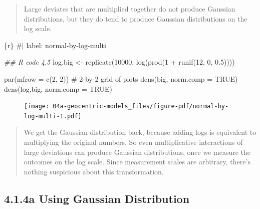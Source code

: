 \documentclass[
  letterpaper,
  DIV=11,
  numbers=noendperiod]{scrreprt}
\newenvironment{Shaded}{\begin{snugshade}}{\end{snugshade}}
\newcommand{\AttributeTok}[1]{\textcolor[rgb]{0.40,0.45,0.13}{#1}}
\newcommand{\CommentTok}[1]{\textcolor[rgb]{0.37,0.37,0.37}{#1}}
\newcommand{\ConstantTok}[1]{\textcolor[rgb]{0.56,0.35,0.01}{#1}}
\newcommand{\DecValTok}[1]{\textcolor[rgb]{0.68,0.00,0.00}{#1}}
\newcommand{\DocumentationTok}[1]{\textcolor[rgb]{0.37,0.37,0.37}{\textit{#1}}}
\newcommand{\FloatTok}[1]{\textcolor[rgb]{0.68,0.00,0.00}{#1}}
\newcommand{\FunctionTok}[1]{\textcolor[rgb]{0.28,0.35,0.67}{#1}}
\newcommand{\InformationTok}[1]{\textcolor[rgb]{0.37,0.37,0.37}{#1}}
\newcommand{\NormalTok}[1]{\textcolor[rgb]{0.00,0.23,0.31}{#1}}
\newcommand{\OtherTok}[1]{\textcolor[rgb]{0.00,0.23,0.31}{#1}}
\newcommand{\SpecialCharTok}[1]{\textcolor[rgb]{0.37,0.37,0.37}{#1}}
\begin{document}
\begin{quote}
Large deviates that are multiplied together do not produce Gaussian
distributions, but they do tend to produce Gaussian distributions on the
log scale.
\end{quote}

\begin{Shaded}
\begin{Highlighting}[]
\InformationTok{\textasciigrave{}\textasciigrave{}\textasciigrave{}\{r\}}
\CommentTok{\#| label: normal{-}by{-}log{-}multi}

\DocumentationTok{\#\# R code 4.5}
\NormalTok{log.big }\OtherTok{\textless{}{-}} \FunctionTok{replicate}\NormalTok{(}\DecValTok{10000}\NormalTok{, }\FunctionTok{log}\NormalTok{(}\FunctionTok{prod}\NormalTok{(}\DecValTok{1} \SpecialCharTok{+} \FunctionTok{runif}\NormalTok{(}\DecValTok{12}\NormalTok{, }\DecValTok{0}\NormalTok{, }\FloatTok{0.5}\NormalTok{))))}

\FunctionTok{par}\NormalTok{(}\AttributeTok{mfrow =} \FunctionTok{c}\NormalTok{(}\DecValTok{2}\NormalTok{, }\DecValTok{2}\NormalTok{)) }\CommentTok{\# 2{-}by{-}2 grid of plots}
\FunctionTok{dens}\NormalTok{(big, }\AttributeTok{norm.comp =} \ConstantTok{TRUE}\NormalTok{)}
\FunctionTok{dens}\NormalTok{(log.big, }\AttributeTok{norm.comp =} \ConstantTok{TRUE}\NormalTok{)}
\InformationTok{\textasciigrave{}\textasciigrave{}\textasciigrave{}}
\end{Highlighting}
\end{Shaded}

\begin{figure}[H]

{\centering \texttt{[image: 04a-geocentric-models\_files/figure-pdf/normal-by-log-multi-1.pdf]}

}

\end{figure}

\begin{quote}
We get the Gaussian distribution back, because adding logs is equivalent
to multiplying the original numbers. So even multiplicative interactions
of large deviations can produce Gaussian distributions, once we measure
the outcomes on the log scale. Since measurement scales are arbitrary,
there's nothing suspicious about this transformation.
\end{quote}

\hypertarget{a-using-gaussian-distribution}{%
\subsection{4.1.4a Using Gaussian
Distribution}\label{a-using-gaussian-distribution}}
\end{document}
